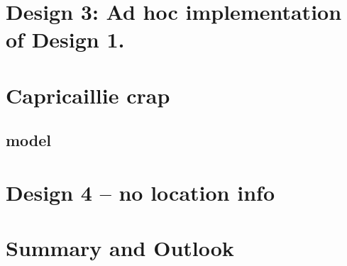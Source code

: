 \section{ Design 3: Ad hoc implementation of Design 1. }

\section{Capricaillie crap}


\begin{figure}
\centering
\label{poisson-mn.fig.capfrags}
\end{figure}


\subsection{model}

\section{Design 4 -- no location info }


\section{Summary and Outlook}


